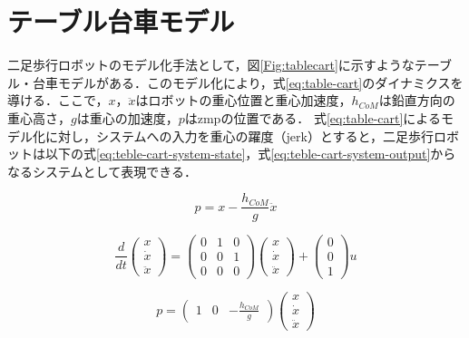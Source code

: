 \section{テーブル台車モデル}
二足歩行ロボットのモデル化手法として，図\ref{Fig:tablecart}に示すようなテーブル・台車モデルがある．このモデル化により，式\eqref{eq:table-cart}のダイナミクスを導ける．ここで，$x$，$\ddot{x}$はロボットの重心位置と重心加速度，$h_{CoM}$は鉛直方向の重心高さ，$g$は重心の加速度，$p$はzmpの位置である．
式\eqref{eq:table-cart}によるモデル化に対し，システムへの入力を重心の躍度（jerk）とすると，二足歩行ロボットは以下の式\eqref{eq:teble-cart-system-state}，式\eqref{eq:teble-cart-system-output}からなるシステムとして表現できる．

\begin{equation}
  p = x - \frac{h_{CoM}}{g}\ddot{x}
  \label{eq:table-cart}
\end{equation}


\begin{equation}
  \frac{d}{dt}\begin{pmatrix}
    x \\ \dot{x} \\ \ddot{x}
  \end{pmatrix}
  =
  \begin{pmatrix}
    0 & 1 & 0 \\ 0 & 0 & 1 \\ 0 & 0 & 0
  \end{pmatrix}
  \begin{pmatrix}
    x \\ \dot{x} \\ \ddot{x}
  \end{pmatrix}
  +
  \begin{pmatrix}
    0 \\ 0 \\ 1
  \end{pmatrix}
  u
  \label{eq:teble-cart-system-state}
\end{equation}


\begin{equation}
  p = \begin{pmatrix}
    1 & 0 & -\frac{h_{CoM}}{g}
  \end{pmatrix}
  \begin{pmatrix}
    x \\ \dot{x} \\ \ddot{x}
  \end{pmatrix}
  \label{eq:teble-cart-system-output}
\end{equation}

